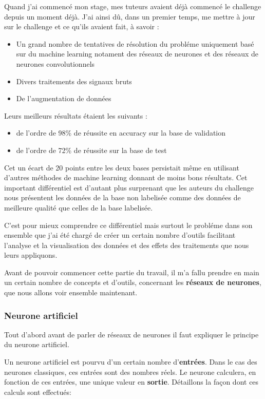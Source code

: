 Quand j'ai commencé mon stage, mes tuteurs avaient déjà commencé le challenge depuis un moment déjà. J'ai ainsi dû, dans un premier temps, me mettre à jour
sur le challenge et ce qu'ils avaient fait, à savoir :

\begin{itemize}
\item Un grand nombre de tentatives de résolution du probléme uniquement basé sur du machine learning notament des réseaux de neurones et des réseaux de neurones convolutionnels
\item Divers traitements des signaux bruts
\item De l'augmentation de données
\end{itemize}

Leurs meilleurs résultats étaient les suivants :
\begin{itemize}
  \item de l'ordre de 98\% de réussite en accuracy sur la base de validation
  \item de l'ordre de 72\% de réussite sur la base de test
\end{itemize}

Cet un écart de 20 points entre les deux bases persistait même en utilisant
d'autres méthodes de machine learning donnant de moins bons résultats.
Cet important différentiel est d'autant plus surprenant que les auteurs du
challenge nous présentent les données de la base non labelisée comme des données
de meilleure qualité que celles de la base labelisée.

C'est pour mieux comprendre ce différentiel mais surtout le probléme dans son
ensemble que j'ai été chargé de créer un certain nombre d'outils facilitant
l'analyse et la visualisation des données et des effets des traitements que
nous leurs appliquons.

Avant de pouvoir commencer cette partie du travail, il m'a fallu prendre en main
un certain nombre de concepts et d'outils, concernant les \textbf{réseaux de neurones}, que nous allons voir ensemble maintenant.

\hypertarget{Neurone-artificiel}{%
\subsubsection{Neurone artificiel}
\label{Neurone-artificiel}}
Tout d'abord avant de parler de réseaux de neurones il faut expliquer le principe du neurone artificiel.

Un neurone artificiel est pourvu d'un certain nombre d'\textbf{entrées}. Dans le cas des neurones classiques, ces entrées sont des nombres réels. Le neurone calculera, en fonction de ces entrées, une unique valeur en \textbf{sortie}.
Détaillons la façon dont ces calculs sont effectués:

